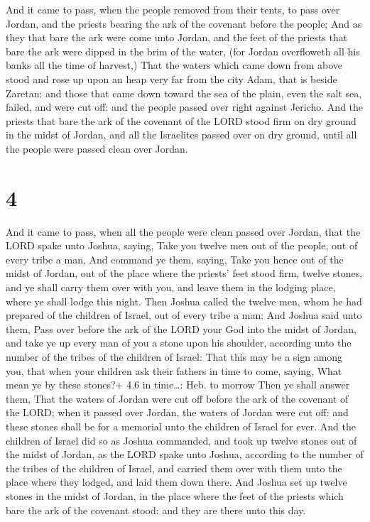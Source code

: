  And it came to pass, when the people removed from their
tents, to pass over Jordan, and the priests bearing the ark of the
covenant before the people;  And as they that bare the ark
were come unto Jordan, and the feet of the priests that bare the ark
were dipped in the brim of the water, (for Jordan overfloweth all his
banks all the time of harvest,)  That the waters which came
down from above stood and rose up upon an heap very far from the city
Adam, that is beside Zaretan: and those that came down toward the sea of
the plain, even the salt sea, failed, and were cut off: and the people
passed over right against Jericho.  And the priests that
bare the ark of the covenant of the LORD stood firm on dry ground in the
midst of Jordan, and all the Israelites passed over on dry ground, until
all the people were passed clean over Jordan.

\hypertarget{section-3}{%
\section{4}\label{section-3}}

 And it came to pass, when all the people were clean passed
over Jordan, that the LORD spake unto Joshua, saying,  Take
you twelve men out of the people, out of every tribe a man, 
And command ye them, saying, Take you hence out of the midst of Jordan,
out of the place where the priests' feet stood firm, twelve stones, and
ye shall carry them over with you, and leave them in the lodging place,
where ye shall lodge this night.  Then Joshua called the
twelve men, whom he had prepared of the children of Israel, out of every
tribe a man:  And Joshua said unto them, Pass over before
the ark of the LORD your God into the midst of Jordan, and take ye up
every man of you a stone upon his shoulder, according unto the number of
the tribes of the children of Israel:  That this may be a
sign among you, that when your children ask their fathers in time to
come, saying, What mean ye by these stones?+ 4.6 in time\ldots: Heb. to
morrow  Then ye shall answer them, That the waters of Jordan
were cut off before the ark of the covenant of the LORD; when it passed
over Jordan, the waters of Jordan were cut off: and these stones shall
be for a memorial unto the children of Israel for ever.  And
the children of Israel did so as Joshua commanded, and took up twelve
stones out of the midst of Jordan, as the LORD spake unto Joshua,
according to the number of the tribes of the children of Israel, and
carried them over with them unto the place where they lodged, and laid
them down there.  And Joshua set up twelve stones in the
midst of Jordan, in the place where the feet of the priests which bare
the ark of the covenant stood: and they are there unto this day.

